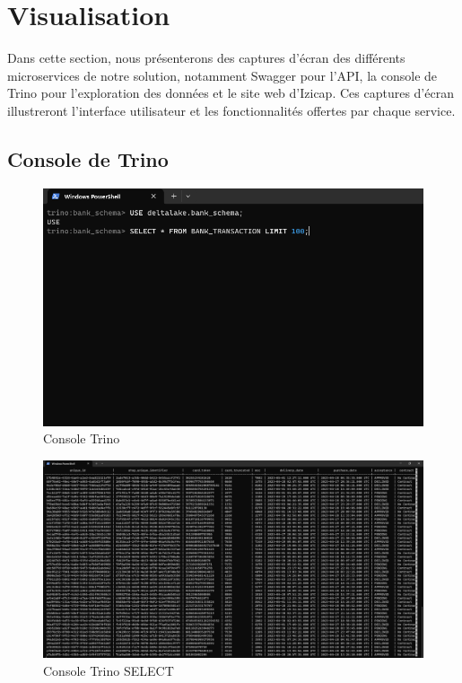 \section{Visualisation}

Dans cette section, nous présenterons des captures d'écran des différents microservices de notre solution, notamment Swagger pour l'API, la console de Trino pour l'exploration des données et le site web d'Izicap. Ces captures d'écran illustreront l'interface utilisateur et les fonctionnalités offertes par chaque service.
\subsection{Console de Trino}

\begin{figure}[H]
\centering
\includegraphics[width=\linewidth]{images/trino-1.png}
\caption{Console Trino}\label{fig:trino-1}
\end{figure}

\begin{figure}[H]
\centering
\includegraphics[width=\linewidth]{images/trino-2.png}
\caption{Console Trino SELECT}\label{fig:trino-2}
\end{figure}

